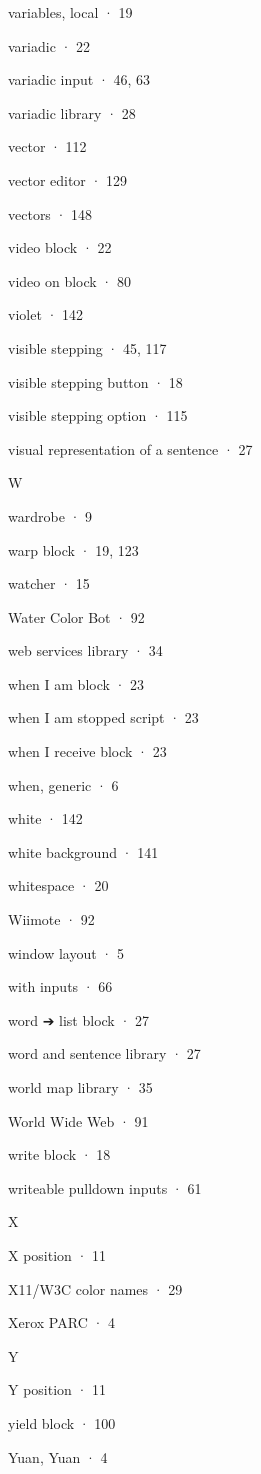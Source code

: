 \documentclass[
  letterpaper,
]{book}
\begin{document}
variables, local · 19

variadic · 22

variadic input · 46, 63

variadic library · 28

vector · 112

vector editor · 129

vectors · 148

video block · 22

video on block · 80

violet · 142

visible stepping · 45, 117

visible stepping button · 18

visible stepping option · 115

visual representation of a sentence · 27

W

wardrobe · 9

warp block · 19, 123

watcher · 15

Water Color Bot · 92

web services library · 34

when I am block · 23

when I am stopped script · 23

when I receive block · 23

when, generic · 6

white · 142

white background · 141

whitespace · 20

Wiimote · 92

window layout · 5

with inputs · 66

word ➔ list block · 27

word and sentence library · 27

world map library · 35

World Wide Web · 91

write block · 18

writeable pulldown inputs · 61

X

X position · 11

X11/W3C color names · 29

Xerox PARC · 4

Y

Y position · 11

yield block · 100

Yuan, Yuan · 4
\end{document}
